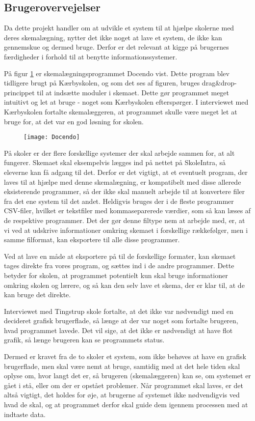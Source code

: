 \subsection{Brugerovervejelser}
\label{brugerovervejelser}
Da dette projekt handler om at udvikle et system til at hjælpe skolerne med deres skemalægning, nytter det ikke noget at lave et system, de ikke kan gennemskue og dermed bruge. Derfor er det relevant at kigge på brugernes færdigheder i forhold til at benytte informationssystemer.

På figur \ref{fig:docendo_skema} er skemalægningsprogrammet Docendo vist. Dette program blev tidligere brugt på Kærbyskolen, og som det ses af figuren, bruges drag\&drop-princippet til at indsætte moduler i skemaet. Dette gør programmet meget intuitivt og let at bruge - noget som Kærbyskolen efterspørger. I interviewet med Kærbyskolen fortalte skemalæggeren, at programmet skulle være meget let at bruge for, at det var en god løsning for skolen.

\begin{figure}[h!]
	\centering
	\texttt{[image: Docendo]}
	\label{fig:docendo_skema}
\end{figure}

På skoler er der flere forskellige systemer der skal arbejde sammen for, at alt fungerer. Skemaet skal eksempelvis lægges ind på nettet på SkoleIntra, så eleverne kan få adgang til det. Derfor er det vigtigt, at et eventuelt program, der laves til at hjælpe med denne skemalægning, er kompatibelt med disse allerede eksisterende programmer, så der ikke skal manuelt arbejde til at konvertere filer fra det ene system til det andet. Heldigvis bruges der i de fleste programmer CSV-filer, hvilket er tekstfiler med kommaseparerede værdier, som så kan læses af de respektive programmer. Det der gør denne filtype nem at arbejde med, er, at vi ved at udskrive informationer omkring skemaet i forskellige rækkefølger, men i samme filformat, kan eksportere til alle disse programmer.

Ved at lave en måde at eksportere på til de forskellige formater, kan skemaet tages direkte fra vores program, og sættes ind i de andre programmer. Dette betyder for skolen, at programmet potentielt kun skal bruge informationer omkring skolen og lærere, og så kan den selv lave et skema, der er klar til, at de kan bruge det direkte.

Interviewet med Tingstrup skole fortalte, at det ikke var nødvendigt med en decideret grafisk brugerflade, så længe at der var noget som fortalte brugeren, hvad programmet lavede. Det vil sige, at det ikke er nødvendigt at have flot grafik, så længe brugeren kan se programmets status. 

Dermed er kravet fra de to skoler et system, som ikke behøves at have en grafisk brugerflade, men skal være nemt at bruge, samtidig med at det hele tiden skal oplyse om, hvor langt det er, så brugeren (skemalæggeren) kan se, om systemet er gået i stå, eller om der er opstået problemer. Når programmet skal laves, er det altså vigtigt, det holdes for øje, at brugerne af systemet ikke nødvendigvis ved hvad de skal, og at programmet derfor skal guide dem igennem processen med at indtaste data.